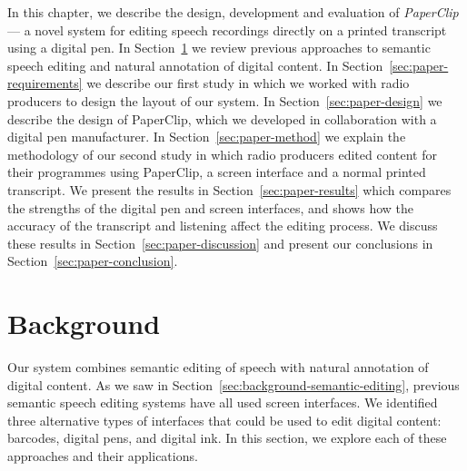 
In this chapter, we describe the design, development and evaluation of \textit{Paper\-Clip} --- a novel system for editing
speech recordings directly on a printed transcript using a digital pen.  In Section~\ref{sec:paper-background} we
review previous approaches to semantic speech editing and natural annotation of digital content. In
Section~\ref{sec:paper-requirements} we describe our first study in which we worked with radio producers to design the
layout of our system. In Section~\ref{sec:paper-design} we describe the design of PaperClip, which we developed in
collaboration with a digital pen manufacturer. In Section~\ref{sec:paper-method} we explain the methodology of our
second study in which radio producers edited content for their programmes using PaperClip, a screen interface and a
normal printed transcript.  We present the results in Section~\ref{sec:paper-results} which compares the strengths of
the digital pen and screen interfaces, and shows how the accuracy of the transcript and listening affect the editing
process.  We discuss these results in Section~\ref{sec:paper-discussion} and present our conclusions in
Section~\ref{sec:paper-conclusion}.


\section{Background}\label{sec:paper-background}


Our system combines semantic editing of speech with natural annotation of digital content. As we saw in
Section~\ref{sec:background-semantic-editing}, previous semantic speech editing systems have all used screen
interfaces. We identified three alternative types of interfaces that could be used to edit digital content:
barcodes,
digital pens,
and digital ink.
In this section, we explore each of these approaches and their applications.

